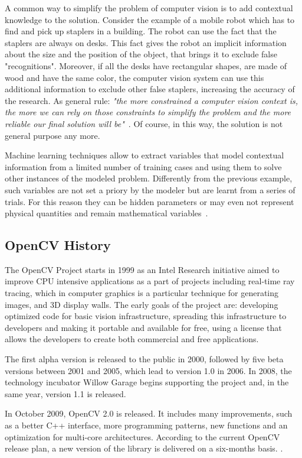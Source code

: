 	A common way to simplify the problem of computer vision is to add contextual knowledge to the solution. 
	Consider the example of a mobile robot which has to find and pick up staplers in a building. The robot can use the fact that the staplers are always on desks. This fact gives the robot an implicit information about the size and the position of the object, that brings it to exclude false "recognitions". Moreover, if all the desks have rectangular shapes, are made of wood and have the same color, the computer vision system can use this additional information to exclude other false staplers, increasing the accuracy of the research. As general rule: \emph{"the more constrained a computer vision context is, the more we can rely on those constraints to simplify the problem and the more reliable our final solution will be"}~\cite[5]{bradski2008learning}. Of course, in this way, the solution is not general purpose any more.
	
	Machine learning techniques allow to extract variables that model contextual information from a limited number of training cases and using them to solve other instances of the modeled problem. 
	Differently from the previous example, such variables are not set a priory by the modeler but are learnt from a series of trials. For this reason they can be hidden parameters or may even not represent physical quantities and remain mathematical variables~\cite{bradski2008learning}.

	\subsection{OpenCV History}
	The \mbox{OpenCV} Project starts in 1999 as an Intel Research initiative aimed to improve CPU intensive applications as a part of projects including real-time ray tracing, which in computer graphics is a particular technique for generating images, and 3D display walls. The early goals of the project are: developing optimized code for basic vision infrastructure, spreading this infrastructure to developers and making it portable and available for free, using a license that allows the developers to create both commercial and free applications.

	The first alpha version is released to the public in 2000, followed by five beta versions between 2001 and 2005, which lead to version 1.0 in 2006. In 2008, the technology incubator Willow Garage begins supporting the project and, in the same year, version 1.1  is released.

	In October 2009, \mbox{OpenCV} 2.0 is released. It includes many improvements, such as a better C++ interface, more programming patterns, new functions and an optimization for multi-core architectures. According to the current \mbox{OpenCV} release plan, a new version of the library is delivered on a six-months basis. \cite{OpenCV:ChangeLogs}.



